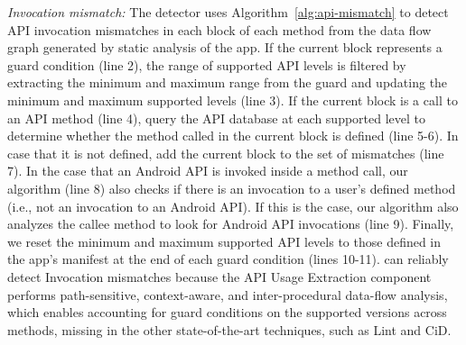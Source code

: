 \textit{Invocation mismatch:} The detector uses
Algorithm~\ref{alg:api-mismatch} to detect API invocation
mismatches in each block of each method from the data flow
graph generated by static analysis of the app. If the
current block represents a guard condition (line 2), the
range of supported API levels is filtered by extracting the
minimum and maximum range from the guard and
updating the minimum and maximum supported levels (line 3).
If the current block is a call to an API method (line 4),
query the API database at each supported level to determine
whether the method called in the current block is defined
(line 5-6).  In case that it is not defined, add the current
block to the set of mismatches (line 7).
%
In the case that an Android API is invoked inside a method
call, our algorithm (line 8) also checks if there is an
invocation to a user's defined method (i.e., not an
invocation to an Android API).  If this is the case, our
algorithm also analyzes the callee method  to look
for Android API invocations (line 9).
Finally, we reset the minimum and maximum supported
API levels to those defined in the app's manifest at the end
of each guard condition (lines 10-11).
%
%
%
\@approach can reliably detect Invocation mismatches because
the API Usage Extraction component performs path-sensitive,
context-aware, and inter-procedural data-flow analysis,
which enables accounting for guard conditions on the
supported versions across methods, missing in the other
state-of-the-art techniques, such as {\sc Lint} and {\sc
CiD}.


\begin{figure}[t!]
        
        \vspace{-5ex}
\end{figure}


